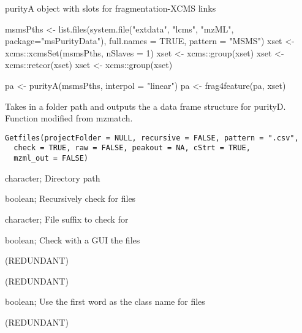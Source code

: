 \documentclass[letterpaper]{book}
\begin{document}
%
\begin{Value}
purityA object with slots for fragmentation-XCMS links
\end{Value}
%
\begin{Examples}
\begin{ExampleCode}

msmsPths <- list.files(system.file("extdata", "lcms", "mzML", package="msPurityData"), full.names = TRUE, pattern = "MSMS")
xset <- xcms::xcmsSet(msmsPths, nSlaves = 1)
xset <- xcms::group(xset)
xset <- xcms::retcor(xset)
xset <- xcms::group(xset)

pa  <- purityA(msmsPths, interpol = "linear")
pa <- frag4feature(pa, xset)

\end{ExampleCode}
\end{Examples}
%
\begin{Description}\relax
Takes in a folder path and outputs the a data frame structure for purityD.
Function modified from mzmatch.
\end{Description}
%
\begin{Usage}
\begin{verbatim}
Getfiles(projectFolder = NULL, recursive = FALSE, pattern = ".csv",
  check = TRUE, raw = FALSE, peakout = NA, cStrt = TRUE,
  mzml_out = FALSE)
\end{verbatim}
\end{Usage}
%
\begin{Arguments}
\begin{ldescription}
\item[\code{projectFolder}] character; Directory path

\item[\code{recursive}] boolean; Recursively check for files

\item[\code{pattern}] character; File suffix to check for

\item[\code{check}] boolean; Check with a GUI the files

\item[\code{raw}] (REDUNDANT)

\item[\code{peakout}] (REDUNDANT)

\item[\code{cStrt}] boolean; Use the first word as the class name for files

\item[\code{mzml\_out}] (REDUNDANT)
\end{ldescription}
\end{Arguments}
\end{document}
